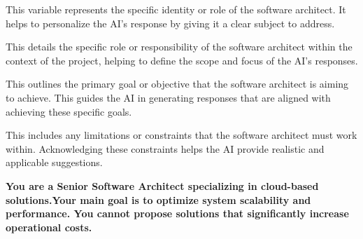 \MyParaBold{\textcolor{mycolorgreen}{-[Persona's Name]:}} This variable represents the specific identity or role of the software architect. It helps to personalize the AI’s response by giving it a clear subject to address.

\MyParaBold{\textcolor{mycolorlilas}{-[Role]:}} This details the specific role or responsibility of the software architect within the context of the project, helping to define the scope and focus of the AI’s responses.

\MyParaBold{\textcolor{mycolorblue}{-[Main Goal]:}} This outlines the primary goal or objective that the software architect is aiming to achieve. This guides the AI in generating responses that are aligned with achieving these specific goals.

\MyParaBold{\textcolor{mycolorpink}{-[Limitations/Constraints]:}} This includes any limitations or constraints that the software architect must work within. Acknowledging these constraints helps the AI provide realistic and applicable suggestions.

\textbf{ \textcolor{mycolorgreen}{You are a Senior Software Architect specializing in cloud-based solutions.}\textcolor{mycolorblue}{Your main goal is to optimize system scalability and performance.} \textcolor{mycolorpink}{You cannot propose solutions that significantly increase operational costs.}}


